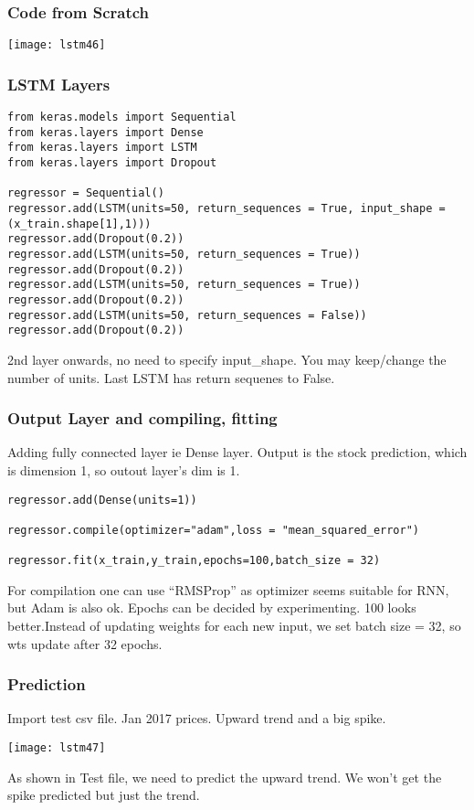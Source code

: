 \begin{frame}[fragile] \frametitle{Code from Scratch}
\begin{center}
\texttt{[image: lstm46]}
\end{center}
\end{frame}

\begin{frame}[fragile] \frametitle{LSTM Layers}

\begin{lstlisting}
from keras.models import Sequential
from keras.layers import Dense
from keras.layers import LSTM
from keras.layers import Dropout

regressor = Sequential()
regressor.add(LSTM(units=50, return_sequences = True, input_shape = (x_train.shape[1],1)))
regressor.add(Dropout(0.2))
regressor.add(LSTM(units=50, return_sequences = True))
regressor.add(Dropout(0.2))
regressor.add(LSTM(units=50, return_sequences = True))
regressor.add(Dropout(0.2))
regressor.add(LSTM(units=50, return_sequences = False))
regressor.add(Dropout(0.2))
\end{lstlisting}
2nd layer onwards, no need to specify input\_shape. You may keep/change the number of units. Last LSTM has return sequenes to False.
\end{frame}


\begin{frame}[fragile] \frametitle{Output Layer and compiling, fitting}
Adding fully connected layer ie Dense layer.
Output is the stock prediction, which is dimension 1, so outout layer's dim is 1.
\begin{lstlisting}
regressor.add(Dense(units=1))

regressor.compile(optimizer="adam",loss = "mean_squared_error")

regressor.fit(x_train,y_train,epochs=100,batch_size = 32)
\end{lstlisting}
For compilation one can use ``RMSProp'' as optimizer seems suitable for RNN, but Adam is also ok.
Epochs can be decided by experimenting. 100 looks better.Instead of updating weights for each new input, we set batch size = 32, so wts update after 32 epochs.
\end{frame}

\begin{frame}[fragile] \frametitle{Prediction}
Import test csv file.
Jan 2017 prices. Upward trend and a big spike.

\begin{center}
\texttt{[image: lstm47]}
\end{center}
As shown in Test file, we need to predict the upward trend. We won't get the spike predicted but just the trend.
\end{frame}

